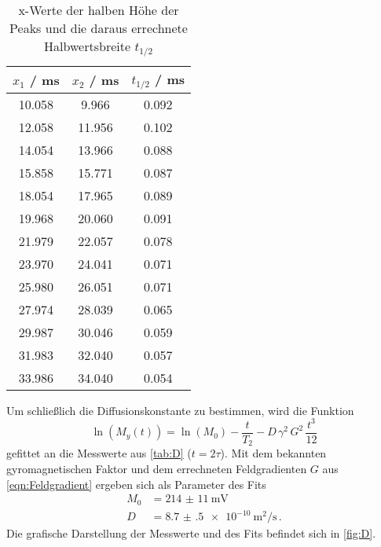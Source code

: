 \begin{table}
  \centering
  \caption{x-Werte der halben Höhe der Peaks und die daraus errechnete
  Halbwertsbreite $t_{1/2}$}
  \label{tab:halbwertsbreite}
  \begin{tabular}{c c c}
    \toprule
    $x_1$ / \si{\ms} & $x_2$ / \si{\ms} & $t_{1/2}$ / \si{\ms} \\
    \midrule
    10.058 & 9.966 & 0.092 \\
    12.058 & 11.956 & 0.102 \\
    14.054 & 13.966 & 0.088 \\
    15.858 & 15.771 & 0.087 \\
    18.054 & 17.965 & 0.089 \\
    19.968 & 20.060 & 0.091 \\
    21.979 & 22.057 & 0.078 \\
    23.970 & 24.041 & 0.071 \\
    25.980 & 26.051 & 0.071 \\
    27.974 & 28.039 & 0.065 \\
    29.987 & 30.046 & 0.059 \\
    31.983 & 32.040 & 0.057 \\
    33.986 & 34.040 & 0.054 \\
    \bottomrule
  \end{tabular}
\end{table}

Um schließlich die Diffusionskonstante zu bestimmen, wird die Funktion
\begin{equation}
  \ln(M_y(t)) = \ln(M_0) - \frac{t}{T_2} - D \, \gamma^2 \, G^2 \, \frac{t^3}{12}
  \label{eqn:Diffusionskonstante}
\end{equation}
gefittet an die Messwerte aus \autoref{tab:D} ($t = 2\tau$). Mit dem bekannten
gyromagnetischen Faktor und dem errechneten Feldgradienten $G$ aus
\eqref{eqn:Feldgradient} ergeben sich als Parameter des Fits
\begin{align}
  M_0 &= \SI{214(11)}{\mV} \label{eqn:M0_D} \\
  D &= \SI{8.7(5)e-10}{\meter\squared\per\second} \, .
\end{align}
Die grafische Darstellung der Messwerte und des Fits befindet sich in
\autoref{fig:D}.


